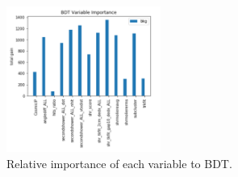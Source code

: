 \documentclass[a4paper]{article}
\begin{document}
\begin{figure}[H]
\begin{center}
\includegraphics[width=0.45\textwidth]{1e0p/bdt_vars_Run3.png}
\caption{\label{fig:1e0p:bdtvars:RUN3} Relative importance of each variable to BDT.}
\end{center}
\end{figure}
\end{document}
